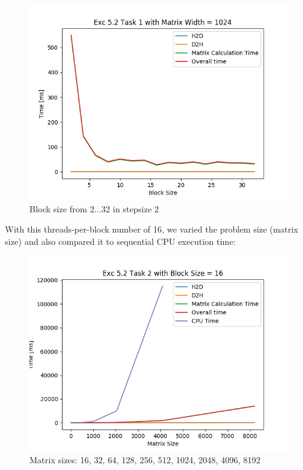 \documentclass[12pt]{article}
\begin{document}
\begin{figure}[!htb]
	\caption{Block size from 2...32  in stepsize 2}
	\includegraphics[scale=0.75]{5_2_01}
	\centering
\end{figure}

\newpage
\noindent With this threads-per-block number of 16, we varied the problem size (matrix size) and also compared it to sequential CPU execution time:\\

\begin{figure}[!htb]
	\caption{Matrix sizes: 16, 32, 64, 128, 256, 512, 1024, 2048, 4096, 8192}
	\includegraphics[scale=0.75]{5_2_02}
	\centering
\end{figure}
\end{document}

